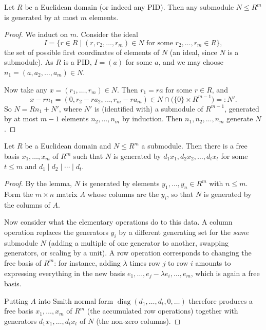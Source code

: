 \documentclass[a4paper]{scrartcl}
\begin{document}
\begin{lemma}
	Let $R$ be a Euclidean domain (or indeed any PID). Then any submodule $N \leq R^m$ is generated by at most $m$ elements.
\end{lemma}
\begin{proof}
	We induct on $m$. Consider the ideal
	$$
	I = \{r \in R \mid (r, r_2, \dots, r_m) \in N \text{ for some } r_2, \dots, r_m \in R\},
	$$
	the set of possible first coordinates of elements of $N$ (an ideal, since $N$ is a submodule). As $R$ is a PID, $I = (a)$ for some $a$, and we may choose $n_1 = (a, a_2, \dots, a_m) \in N$.

	Now take any $x = (r_1, \dots, r_m) \in N$. Then $r_1 = ra$ for some $r \in R$, and
	$$
	x - r n_1 = (0, r_2 - ra_2, \dots, r_m - ra_m) \in N \cap \big(\{0\} \times R^{m - 1}\big) =: N'.
	$$
	So $N = Rn_1 + N'$, where $N'$ is (identified with) a submodule of $R^{m-1}$, generated by at most $m - 1$ elements $n_2, \dots, n_m$ by induction. Then $n_1, n_2, \dots, n_m$ generate $N$.
\end{proof}

\begin{theorem}
	Let $R$ be a Euclidean domain and $N \leq R^m$ a submodule. Then there is a free basis $x_1, \dots, x_m$ of $R^m$ such that $N$ is generated by $d_1 x_1, d_2 x_2, \dots, d_t x_t$ for some $t \leq m$ and $d_1 \mid d_2 \mid \cdots \mid d_t$.
\end{theorem}
\begin{proof}
	By the lemma, $N$ is generated by elements $y_1, \dots, y_n \in R^m$ with $n \leq m$. Form the $m \times n$ matrix $A$ whose columns are the $y_i$, so that $N$ is generated by the columns of $A$.

	Now consider what the elementary operations do to this data. A column operation replaces the generators $y_i$ by a different generating set for the \emph{same} submodule $N$ (adding a multiple of one generator to another, swapping generators, or scaling by a unit). A row operation corresponds to changing the free basis of $R^m$: for instance, adding $\lambda$ times row $j$ to row $i$ amounts to expressing everything in the new basis $e_1, \dots, e_j - \lambda e_i, \dots, e_m$, which is again a free basis.

	Putting $A$ into Smith normal form $\operatorname{diag}(d_1, \dots, d_t, 0, \dots)$ therefore produces a free basis $x_1, \dots, x_m$ of $R^m$ (the accumulated row operations) together with generators $d_1 x_1, \dots, d_t x_t$ of $N$ (the non-zero columns).
\end{proof}
\end{document}

